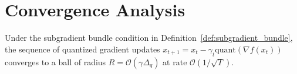 \section{Convergence Analysis}
\label{sec:convergence}

\begin{theorem}
\label{thm:quantized_convergence}
Under the subgradient bundle condition in Definition~\ref{def:subgradient_bundle}, the sequence of quantized gradient updates $x_{t+1} = x_t - \gamma_t \text{quant}(\nabla f(x_t))$ converges to a ball of radius $R = \mathcal{O}(\gamma \Delta_q)$ at rate $\mathcal{O}(1/\sqrt{T})$.
\end{theorem}
